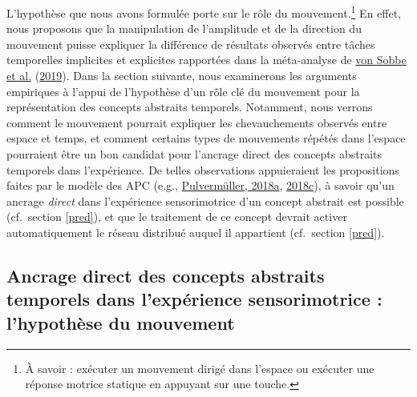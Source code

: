 \documentclass[
  a4paper,12pt,twoside,onecolumn,openright,final,oldfontcommands]{memoir}
\begin{document}
L'hypothèse que nous avons formulée porte sur le rôle du mouvement.\footnote{À savoir : exécuter un mouvement dirigé dans l'espace ou exécuter une réponse motrice statique en appuyant sur une touche.} En effet, nous proposons que la manipulation de l'amplitude et de la direction du mouvement puisse expliquer la différence de résultats observés entre tâches temporelles implicites et explicites rapportées dans la méta-analyse de \protect\hyperlink{ref-von_sobbe_space-time_2019}{von Sobbe et al.} (\protect\hyperlink{ref-von_sobbe_space-time_2019}{2019}). Dans la section suivante, nous examinerons les arguments empiriques à l'appui de l'hypothèse d'un rôle clé du mouvement pour la représentation des concepts abstraits temporels. Notamment, nous verrons comment le mouvement pourrait expliquer les chevauchements observés entre espace et temps, et comment certains types de mouvements répétés dans l'espace pourraient être un bon candidat pour l'ancrage direct des concepts abstraits temporels dans l'expérience. De telles observations appuieraient les propositions faites par le modèle des APC (e.g., \protect\hyperlink{ref-pulvermuller_neural_2018}{Pulvermüller, 2018a}, \protect\hyperlink{ref-pulvermuller_case_2018}{2018c}), à savoir qu'un ancrage \emph{direct} dans l'expérience sensorimotrice d'un concept abstrait est possible (cf.~section \ref{pred}), et que le traitement de ce concept devrait activer automatiquement le réseau distribué auquel il appartient (cf.~section \ref{pred}).

\hypertarget{ancrage}{%
\subsection{Ancrage direct des concepts abstraits temporels dans l'expérience sensorimotrice : l'hypothèse du mouvement}\label{ancrage}}
\end{document}

